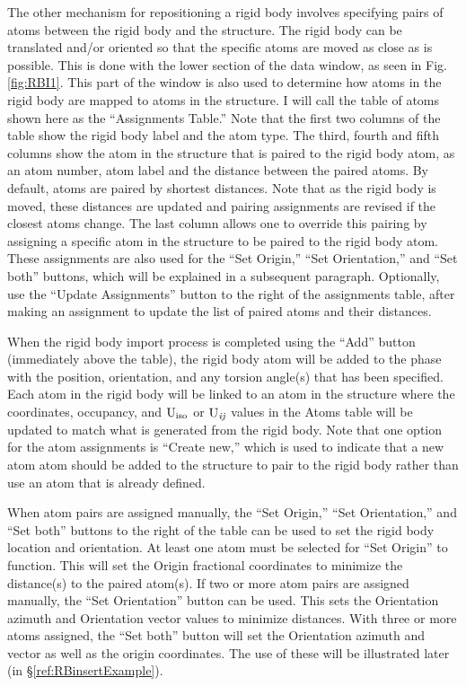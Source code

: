 The other mechanism for repositioning a rigid body involves specifying pairs of atoms between the rigid body and the structure. The rigid body can be translated and/or oriented so that the specific atoms are moved as close as is possible. This is done with the lower section of the data window, as seen in Fig. \ref{fig:RBI1}. This part of the window is also used to determine how atoms in the rigid body are mapped to atoms in the structure.  I will call the table of atoms shown here as the ``Assignments Table.'' Note that the first two columns of the table show the rigid body label and the atom type. The third, fourth and fifth columns show the atom in the structure that is paired to the rigid body atom, as an atom number, atom label and the distance between the paired atoms. By default, atoms are paired by shortest distances. Note that as the rigid body is moved, these distances are updated and pairing assignments are revised if the closest atoms change. The last column allows one to override this pairing by assigning a specific atom in the structure to be paired to the rigid body atom. 
These assignments are also used for the ``Set Origin,'' ``Set Orientation,'' and ``Set both'' buttons, which will be explained in a subsequent paragraph. 
Optionally, use the ``Update Assignments'' button to the right of the assignments table, after making an assignment to update the list of paired atoms and their distances. 

When the rigid body import process is completed using the ``Add'' button (immediately above the table), the rigid body atom will be added to the phase with the position, orientation, and any torsion angle(s) that has been specified. Each atom in the rigid body will be linked to an atom in the structure where the coordinates, occupancy, and $\rm U_{iso}$ or $\rm U_{\it ij}$ values in the Atoms table will be updated to match what is generated from the rigid body. 
Note that one option for the atom assignments is ``Create new,'' which is used to indicate that a new atom atom should be added to the structure to pair to the rigid body rather than use an atom that is already defined. 

When atom pairs are assigned manually, the ``Set Origin,'' ``Set Orientation,'' and ``Set both'' buttons to the right of the table can be used to set the rigid body location and orientation. At least one atom must be selected for ``Set Origin'' to function. This will set the Origin fractional coordinates to minimize the distance(s) to the paired atom(s). 
If two or more atom pairs are assigned manually, the ``Set Orientation'' button can be used. This sets the Orientation azimuth and Orientation vector values to minimize distances. With three or more atoms assigned, the ``Set both'' button will set the Orientation azimuth and vector as well as the origin coordinates. The use of these will be illustrated later (in \S\ref{ref:RBinsertExample}).

